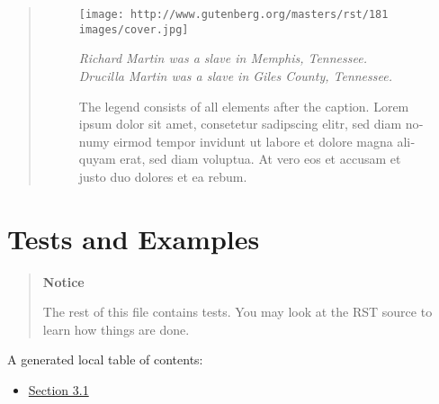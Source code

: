 \documentclass[a5paper]{book}
\begin{document}
\begin{german}
\begin{quotation}\noindent
\begin{container}
\begin{figure}[h!]
\label{figure-4}%
\hypertarget{figure-4}{}%
\begin{center}
\begin{center}
\texttt{[image: http://www.gutenberg.org/masters/rst/181\\images/cover.jpg]}
\end{center}
\begin{center}
{\itshape{Richard Martin was a slave in Memphis, Tennessee. \\
Drucilla Martin was a slave in Giles County, Tennessee.
}}
\end{center}

\vspace{1em}
The legend consists of all elements after the caption.  Lorem
ipsum dolor sit amet, consetetur sadipscing elitr, sed diam
nonumy eirmod tempor invidunt ut labore et dolore magna aliquyam
erat, sed diam voluptua. At vero eos et accusam et justo duo
dolores et ea rebum.\par
\end{center}
\end{figure}
\end{container}
\end{quotation}

\cleardoublepage
\label{tests-and-examples}%
\hypertarget{tests-and-examples}{}%
%
\chapter*{
\vspace{1em}
Tests and Examples}


\begin{quotation}
\textbf{{\noindent}Notice}\par

\vspace{1em}


The rest of this file contains tests. You may look at the RST
source to learn how things are done.\par
\end{quotation}

A generated local table of contents:\par

\begin{container}
\begin{itemize}
\item[] \hyperlink{section-3-1}{Section 3.1}


\end{itemize}
\end{container}
\end{german}
\end{document}
